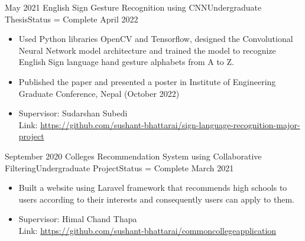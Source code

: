 \documentclass[localFont,alternative]{documentMETADATA}
\begin{document}
\renewcommand{\arraystretch}{1.3}
\begin{experiences}
	\experience
	{May 2021} {English Sign Gesture Recognition using CNN}{Undergraduate Thesis}{Status = Complete}
	{April 2022}    {\begin{itemize}
			\item Used Python libraries OpenCV and Tensorflow, designed the Convolutional Neural Network model architecture and trained the model to recognize English Sign language hand gesture alphabets from A to Z. 
            \item Published the paper and presented a poster in Institute of Engineering Graduate Conference, Nepal (October 2022)
			\item Supervisor: Sudarshan Subedi
            \\ \color{blue} {Link: \href{https://github.com/sushant-bhattarai/sign-language-recognition-major-project}{https://github.com/sushant-bhattarai/sign-language-recognition-major-project}}
	\end{itemize}}
{}
\end{experiences}
\begin{experiences}
	\experience
	{September 2020} {Colleges Recommendation System using Collaborative Filtering}{Undergraduate Project}{Status = Complete}
	{March 2021}    {\begin{itemize}
			\item Built a website using Laravel framework that recommends high schools to users according to their interests and consequently users can apply to them.
			\item Supervisor: Himal Chand Thapa
            \\ \color{blue} {Link: \href{https://github.com/sushant-bhattarai/commoncollegeapplication}{https://github.com/sushant-bhattarai/commoncollegeapplication}}
	\end{itemize}}
{}
\end{experiences}
\end{document}

